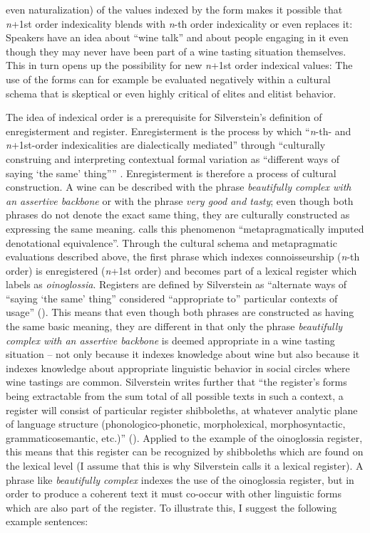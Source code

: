 even naturalization) of the values indexed by the form makes it possible that \emph{n}+1st order indexicality blends with \emph{n}{}-th order indexicality or even replaces it: Speakers have an idea about “wine talk” and about people engaging in it even though they may never have been part of a wine tasting situation themselves. This in turn opens up the possibility for new \emph{n}+1st order indexical values: The use of the forms can for example be evaluated negatively within a cultural schema that is skeptical or even highly critical of elites and elitist behavior.


The idea of indexical order is a prerequisite for Silverstein’s definition of enregisterment and register. Enregisterment is the process by which “\textit{n}-th- and \textit{n}+1st-order indexicalities are dialectically mediated” through “culturally construing and interpreting contextual formal variation as “different ways of saying ‘the same’ thing”” \citep[216]{Silverstein2003}. Enregisterment is therefore a process of cultural construction. A wine can be described with the phrase \emph{beautifully complex with an assertive backbone} or with the phrase \emph{very good and tasty}; even though both phrases do not denote the exact same thing, they are culturally constructed as expressing the same meaning. \citet[212]{Silverstein2003} calls this phenomenon “metapragmatically imputed denotational equivalence”. Through the cultural schema and metapragmatic evaluations described above, the first phrase which indexes connoisseurship (\emph{n}-th order) is enregistered (\emph{n}+1st order) and becomes part of a lexical register which \citet{Silverstein2003} labels as \textit{oinoglossia}. Registers are defined by Silverstein as “alternate ways of “saying ‘the same’ thing” considered “appropriate to” particular contexts of usage” (\citeyear[212]{Silverstein2003}). This means that even though both phrases are constructed as having the same basic meaning, they are different in that only the phrase \emph{beautifully complex with an assertive backbone} is deemed appropriate in a wine tasting situation – not only because it indexes knowledge about wine but also because it indexes knowledge about appropriate linguistic behavior in social circles where wine tastings are common. Silverstein writes further that “the register’s forms being extractable from the sum total of all possible texts in such a context, a register will consist of particular register shibboleths, at whatever analytic plane of language structure (phonologico-phonetic, morpholexical, morphosyntactic, grammaticosemantic, etc.)” (\citeyear[212]{Silverstein2003}). Applied to the example of the oinoglossia register, this means that this register can be recognized by shibboleths which are found on the lexical level (I assume that this is why Silverstein calls it a lexical register). A phrase like \emph{beautifully complex} indexes the use of the oinoglossia register, but in order to produce a coherent text it must co-occur with other linguistic forms which are also part of the register. To illustrate this, I suggest the following example sentences:
